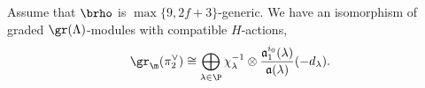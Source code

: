 \begin{thm}\label{thm:gr-pi2}
Assume that $\brho$ is $\max\{9,2f+3\}$-generic. We have an isomorphism of graded $\gr(\Lambda)$-modules with compatible $H$-actions,
\begin{equation}\label{eq:gr-pi2}
\gr_\m(\pi_2^\vee) \cong \bigoplus_{\lambda \in \P} \chi_\lambda^{-1} \otimes \frac{\mathfrak{a}_1^{i_0}(\lambda)}{\mathfrak{a}(\lambda)}(-d_\lambda).
\end{equation}
\end{thm}

